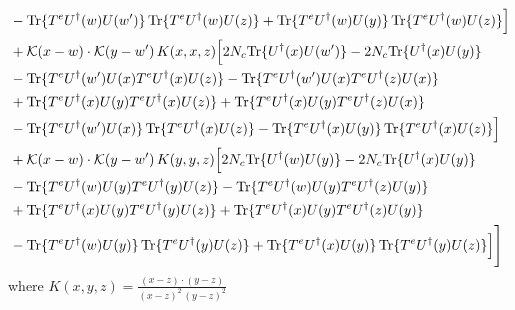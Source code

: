 \documentclass[9pt]{article}
\numberwithin{equation}{section}
\begin{document}
\begin{align}
&-{\rm Tr}\{T^eU^\dagger(w)U(w')\}\,{\rm Tr}\{T^eU^\dagger(w)U(z)\}+{\rm Tr}\{T^eU^\dagger(w)U(y)\}\,{\rm Tr}\{T^eU^\dagger(w)U(z)\}\Big]\notag\\
&+\mathcal K(x-w)\cdot\mathcal K(y-w')\,K(x,x,z)\Big[2 N_{c}{\rm Tr}\{U^\dagger(x)U(w')\}-2 N_{c}{\rm Tr}\{U^\dagger(x)U(y)\}\notag\\
&-{\rm Tr}\{T^eU^\dagger(w')U(x)T^eU^\dagger(x)U(z)\}-{\rm Tr}\{T^eU^\dagger(w')U(x)T^eU^\dagger(z)U(x)\}\notag\\
&+{\rm Tr}\{T^eU^\dagger(x)U(y)T^eU^\dagger(x)U(z)\}+{\rm Tr}\{T^eU^\dagger(x)U(y)T^eU^\dagger(z)U(x)\}\notag\\
&-{\rm Tr}\{T^eU^\dagger(w')U(x)\}\,{\rm Tr}\{T^eU^\dagger(x)U(z)\}-{\rm Tr}\{T^eU^\dagger(x)U(y)\}\,{\rm Tr}\{T^eU^\dagger(x)U(z)\}\Big]\notag\\
&+\mathcal K(x-w)\cdot\mathcal K(y-w')\,K(y,y,z)\Big[2 N_{c}{\rm Tr}\{U^\dagger(w)U(y)\}-2 N_{c}{\rm Tr}\{U^\dagger(x)U(y)\}\notag\\
&-{\rm Tr}\{T^eU^\dagger(w)U(y)T^eU^\dagger(y)U(z)\}-{\rm Tr}\{T^eU^\dagger(w)U(y)T^eU^\dagger(z)U(y)\}\notag\\
&+{\rm Tr}\{T^eU^\dagger(x)U(y)T^eU^\dagger(y)U(z)\}+{\rm Tr}\{T^eU^\dagger(x)U(y)T^eU^\dagger(z)U(y)\}\notag\\
&-{\rm Tr}\{T^eU^\dagger(w)U(y)\}\,{\rm Tr}\{T^eU^\dagger(y)U(z)\}+{\rm Tr}\{T^eU^\dagger(x)U(y)\}\,{\rm Tr}\{T^eU^\dagger(y)U(z)\}\Big]\Bigg]
\end{align} 
where $K(x,y,z) = \frac{(x-z)\cdot (y-z)}{(x-z)^{2}\,(y-z)^{2}}$
\end{document}
